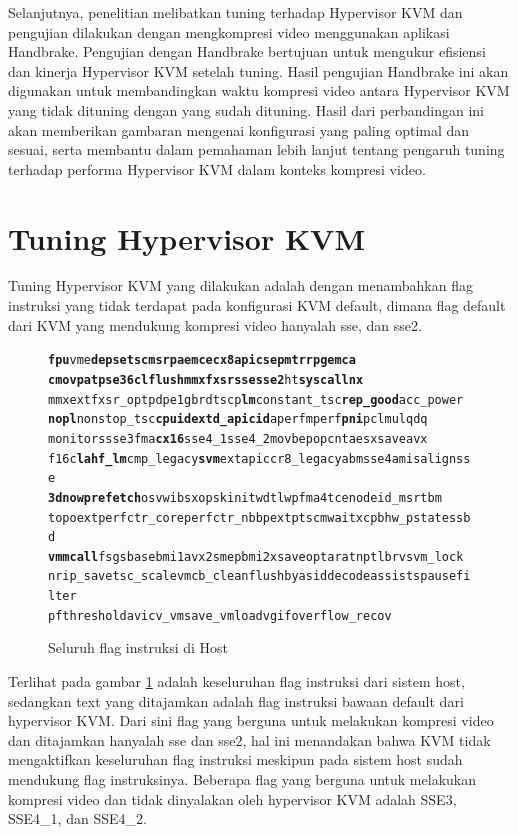 Selanjutnya, penelitian melibatkan tuning terhadap Hypervisor KVM dan pengujian dilakukan dengan mengkompresi video menggunakan aplikasi Handbrake. Pengujian dengan Handbrake bertujuan untuk mengukur efisiensi dan kinerja Hypervisor KVM setelah tuning. Hasil pengujian Handbrake ini akan digunakan untuk membandingkan waktu kompresi video antara Hypervisor KVM yang tidak dituning dengan yang sudah dituning. Hasil dari perbandingan ini akan memberikan gambaran mengenai konfigurasi yang paling optimal dan sesuai, serta membantu dalam pemahaman lebih lanjut tentang pengaruh tuning terhadap performa Hypervisor KVM dalam konteks kompresi video.

\section{Tuning Hypervisor KVM}
Tuning Hypervisor KVM yang dilakukan adalah dengan menambahkan flag instruksi yang tidak terdapat pada konfigurasi KVM default, dimana flag default dari KVM yang mendukung kompresi video hanyalah sse, dan sse2.

\begin{figure}
	\begin{alltt}
		\textbf{fpu} vme \textbf{de pse tsc msr pae mce cx8 apic sep mtrr pge mca} 
		\textbf{cmov pat pse36 clflush mmx fxsr sse sse2} ht \textbf{syscall nx} 
		mmxext fxsr_opt pdpe1gb rdtscp \textbf{lm} constant_tsc \textbf{rep_good} acc_power
		\textbf{nopl} nonstop_tsc \textbf{cpuid}  \textbf{extd_apicid} aperfmperf \textbf{pni} pclmulqdq 
		monitor ssse3 fma \textbf{cx16} sse4_1  sse4_2 movbe popcnt aes xsave avx 
		f16c \textbf{lahf_lm} cmp_legacy \textbf{svm} extapic cr8_legacy abm sse4a misalignsse
		\textbf{3dnowprefetch} osvw ibs xop skinit wdt lwp fma4 tce nodeid_msr tbm
		topoext perfctr_core perfctr_nb bpext ptsc mwaitx cpb hw_pstate ssbd 
		\textbf{vmmcall} fsgsbase bmi1 avx2 smep bmi2 xsaveopt arat npt lbrv svm_lock
		nrip_save tsc_scale vmcb_clean flushbyasid decodeassists pausefilter 
		pfthreshold avic v_vmsave_vmload vgif overflow_recov
	\end{alltt}
	\caption{Seluruh flag instruksi di Host}
	\label{fig:flag_kvm_host}
\end{figure}

Terlihat pada gambar \ref{fig:flag_kvm_host} adalah keseluruhan flag instruksi dari sistem host, sedangkan text yang ditajamkan adalah flag instruksi bawaan default dari hypervisor KVM. Dari sini flag yang berguna untuk melakukan kompresi video dan ditajamkan hanyalah sse dan sse2, hal ini menandakan bahwa KVM tidak mengaktifkan keseluruhan flag instruksi meskipun pada sistem host sudah mendukung flag instruksinya. Beberapa flag yang berguna untuk melakukan kompresi video dan tidak dinyalakan oleh hypervisor KVM adalah SSE3, SSE4\_1, dan SSE4\_2. 

